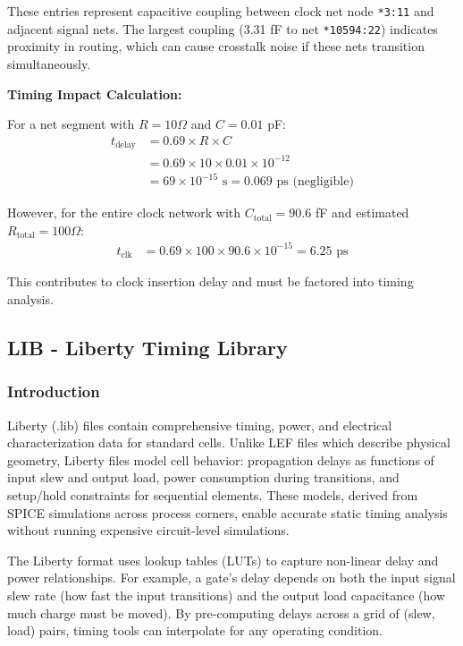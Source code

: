 \documentclass[12pt,a4paper]{article}
\begin{document}
These entries represent capacitive coupling between clock net node \texttt{*3:11} and adjacent signal nets. The largest coupling (3.31 fF to net \texttt{*10594:22}) indicates proximity in routing, which can cause crosstalk noise if these nets transition simultaneously.

\textbf{Timing Impact Calculation:}

For a net segment with $R = 10 \Omega$ and $C = 0.01$ pF:
\begin{align}
    t_{\text{delay}} &= 0.69 \times R \times C \nonumber \\
    &= 0.69 \times 10 \times 0.01 \times 10^{-12} \nonumber \\
    &= 69 \times 10^{-15} \text{ s} = 0.069 \text{ ps (negligible)}
\end{align}

However, for the entire clock network with $C_{\text{total}} = 90.6$ fF and estimated $R_{\text{total}} = 100 \Omega$:
\begin{align}
    t_{\text{clk}} &= 0.69 \times 100 \times 90.6 \times 10^{-15} = 6.25 \text{ ps}
\end{align}

This contributes to clock insertion delay and must be factored into timing analysis.

\newpage

\subsection{LIB - Liberty Timing Library}

\subsubsection{Introduction}

Liberty (.lib) files contain comprehensive timing, power, and electrical characterization data for standard cells. Unlike LEF files which describe physical geometry, Liberty files model cell behavior: propagation delays as functions of input slew and output load, power consumption during transitions, and setup/hold constraints for sequential elements. These models, derived from SPICE simulations across process corners, enable accurate static timing analysis without running expensive circuit-level simulations.

The Liberty format uses lookup tables (LUTs) to capture non-linear delay and power relationships. For example, a gate's delay depends on both the input signal slew rate (how fast the input transitions) and the output load capacitance (how much charge must be moved). By pre-computing delays across a grid of (slew, load) pairs, timing tools can interpolate for any operating condition.
\end{document}
